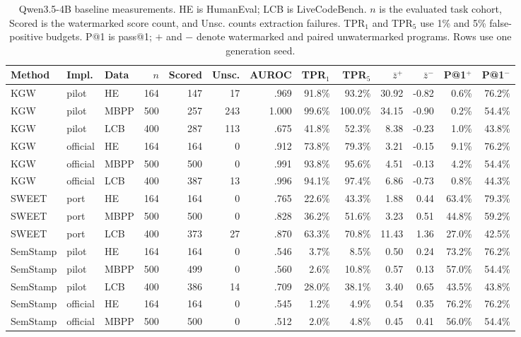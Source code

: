 \documentclass[11pt]{article}
\begin{document}
\clearpage
\small
\setlength{\LTcapwidth}{\textwidth}
\setlength{\tabcolsep}{3pt}
\begin{longtable}{lllrrrrrrrrrr}
\caption{Qwen3.5-4B baseline measurements. HE is HumanEval; LCB is LiveCodeBench.
$n$ is the evaluated task cohort, Scored is the watermarked score count,
and Unsc. counts extraction failures. TPR$_1$ and TPR$_5$ use 1\% and 5\%
false-positive budgets. P@1 is pass@1; $+$ and $-$ denote watermarked and
paired unwatermarked programs. Rows use one generation seed.}\label{tab:baseline}\\
\toprule
Method & Impl. & Data & $n$ & Scored & Unsc. & AUROC & TPR$_1$ & TPR$_5$ &
$\bar z^+$ & $\bar z^-$ & P@1$^+$ & P@1$^-$ \\
\midrule
KGW & pilot & HE & 164 & 147 & 17 & .969 & 91.8\% & 93.2\% & 30.92 & -0.82 & 0.6\% & 76.2\% \\
KGW & pilot & MBPP & 500 & 257 & 243 & 1.000 & 99.6\% & 100.0\% & 34.15 & -0.90 & 0.2\% & 54.4\% \\
KGW & pilot & LCB & 400 & 287 & 113 & .675 & 41.8\% & 52.3\% & 8.38 & -0.23 & 1.0\% & 43.8\% \\
KGW & official & HE & 164 & 164 & 0 & .912 & 73.8\% & 79.3\% & 3.21 & -0.15 & 9.1\% & 76.2\% \\
KGW & official & MBPP & 500 & 500 & 0 & .991 & 93.8\% & 95.6\% & 4.51 & -0.13 & 4.2\% & 54.4\% \\
KGW & official & LCB & 400 & 387 & 13 & .996 & 94.1\% & 97.4\% & 6.86 & -0.73 & 0.8\% & 44.3\% \\
\midrule
SWEET & port & HE & 164 & 164 & 0 & .765 & 22.6\% & 43.3\% & 1.88 & 0.44 & 63.4\% & 79.3\% \\
SWEET & port & MBPP & 500 & 500 & 0 & .828 & 36.2\% & 51.6\% & 3.23 & 0.51 & 44.8\% & 59.2\% \\
SWEET & port & LCB & 400 & 373 & 27 & .870 & 63.3\% & 70.8\% & 11.43 & 1.36 & 27.0\% & 42.5\% \\
\midrule
SemStamp & pilot & HE & 164 & 164 & 0 & .546 & 3.7\% & 8.5\% & 0.50 & 0.24 & 73.2\% & 76.2\% \\
SemStamp & pilot & MBPP & 500 & 499 & 0 & .560 & 2.6\% & 10.8\% & 0.57 & 0.13 & 57.0\% & 54.4\% \\
SemStamp & pilot & LCB & 400 & 386 & 14 & .709 & 28.0\% & 38.1\% & 3.40 & 0.65 & 43.5\% & 43.8\% \\
SemStamp & official & HE & 164 & 164 & 0 & .545 & 1.2\% & 4.9\% & 0.54 & 0.35 & 76.2\% & 76.2\% \\
SemStamp & official & MBPP & 500 & 500 & 0 & .512 & 2.0\% & 4.8\% & 0.45 & 0.41 & 56.0\% & 54.4\% \\

\end{longtable}
\end{document}
